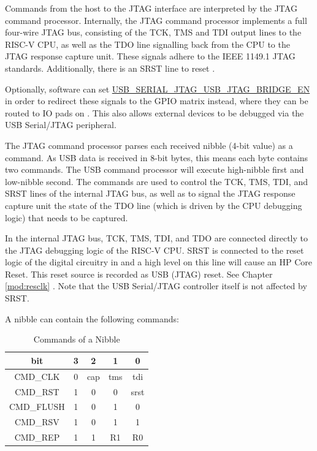 \documentclass[main\_\_EN.tex]{subfiles}
\begin{document}
Commands from the host to the JTAG interface are interpreted by the JTAG command processor. Internally, the JTAG command processor implements a full four-wire JTAG bus, consisting of the TCK, TMS and TDI output lines to the RISC-V CPU, as well as the TDO line signalling back from the CPU to the JTAG response capture unit. These signals adhere to the IEEE 1149.1 JTAG standards. Additionally, there is an SRST line to reset \chipname{}.

Optionally, software can set \hyperref[fielddesc:USBSERIALJTAGUSBJTAGBRIDGEEN]{USB\_SERIAL\_JTAG\_USB\_JTAG\_BRIDGE\_EN} in order to redirect these signals to the GPIO matrix instead, where they can be routed to IO pads on \chipname{}. This also allows external devices to be debugged via the USB Serial/JTAG peripheral.

The JTAG command processor parses each received nibble (4-bit value) as a command. As USB data is received in 8-bit bytes, this means each byte contains two commands. The USB command processor will execute high-nibble first and low-nibble second. The commands are used to control the TCK, TMS, TDI, and SRST lines of the internal JTAG bus, as well as to signal the JTAG response capture unit the state of the TDO line (which is driven by the CPU debugging logic) that needs to be captured.

In the internal JTAG bus, TCK, TMS, TDI, and TDO are connected directly to the JTAG debugging logic of the RISC-V CPU. SRST is connected to the reset logic of the digital circuitry in \chipname{} and a high level on this line will cause an HP Core Reset. This reset source is recorded as USB (JTAG) reset. See Chapter \ref{mod:resclk} \textit{}. Note that the USB Serial/JTAG controller itself is not affected by SRST.

A nibble can contain the following commands:

\begin{table}[H]
\centering
\caption{Commands of a Nibble}
\label{tab:usbserialjtag-commands-of-a-nibble}

\begin{tabular}{|c|c c c c|}\hline
\rowcolor{lightgray}
\textbf{bit} & \textbf{3} & \textbf{2} & \textbf{1} & \textbf{0}\\\hline

CMD\_CLK & 0 &  cap & tms & tdi \\\hline
CMD\_RST & 1 & 0 & 0 & srst \\\hline
CMD\_FLUSH & 1 & 0 & 1 & 0 \\\hline
CMD\_RSV & 1 & 0 & 1 & 1 \\\hline
CMD\_REP & 1 & 1 & R1 & R0 \\\hline
\end{tabular}
\end{table}
\end{document}
